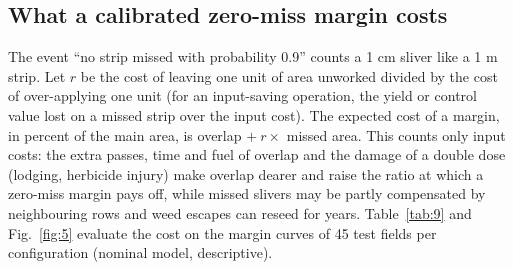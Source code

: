 \documentclass[preprint,12pt,authoryear]{elsarticle}
\begin{document}
\subsection{What a calibrated zero-miss margin costs}

The event ``no strip missed with probability 0.9'' counts a 1 cm sliver like a 1 m strip. Let \(r\) be the cost of leaving one unit of area unworked divided by the cost of over-applying one unit (for an input-saving operation, the yield or control value lost on a missed strip over the input cost). The expected cost of a margin, in percent of the main area, is overlap \(+\ r\times\) missed area. This counts only input costs: the extra passes, time and fuel of overlap and the damage of a double dose (lodging, herbicide injury) make overlap dearer and raise the ratio at which a zero-miss margin pays off, while missed slivers may be partly compensated by neighbouring rows and weed escapes can reseed for years. Table~\ref{tab:9} and Fig.~\ref{fig:5} evaluate the cost on the margin curves of 45 test fields per configuration (nominal model, descriptive).
\end{document}
